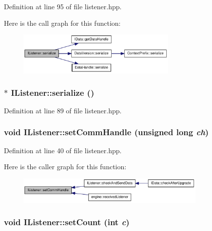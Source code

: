Definition at line 95 of file listener.hpp.

Here is the call graph for this function:\nopagebreak
\begin{figure}[H]
\begin{center}
\leavevmode
\includegraphics[width=223pt]{class_i_listener_aab9d4cfe83a94b1ca4480e8d186ff112_cgraph}
\end{center}
\end{figure}
\hypertarget{class_i_listener_a4e270e6c78f576bcca1dbccda5305ac3}{
\subsubsection[{serialize}]{$\ast$ IListener::serialize ()}}
\label{class_i_listener_a4e270e6c78f576bcca1dbccda5305ac3}


Definition at line 89 of file listener.hpp.\hypertarget{class_i_listener_a808fd91db5dba945320316a8b6c99dca}{
\subsubsection[{setCommHandle}]{\setlength{\rightskip}{0pt plus 5cm}void IListener::setCommHandle (unsigned long {\em ch})}}
\label{class_i_listener_a808fd91db5dba945320316a8b6c99dca}


Definition at line 40 of file listener.hpp.

Here is the caller graph for this function:\nopagebreak
\begin{figure}[H]
\begin{center}
\leavevmode
\includegraphics[width=265pt]{class_i_listener_a808fd91db5dba945320316a8b6c99dca_icgraph}
\end{center}
\end{figure}
\hypertarget{class_i_listener_a9def0a8ed3ed91e1956b7b9ce1473b2e}{
\subsubsection[{setCount}]{\setlength{\rightskip}{0pt plus 5cm}void IListener::setCount (int {\em c})}}
\label{class_i_listener_a9def0a8ed3ed91e1956b7b9ce1473b2e}


